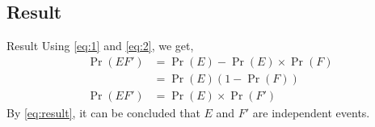 \documentclass{beamer}
\providecommand{\pr}[1]{\ensuremath{\Pr\left(#1\right)}}
\providecommand{\brak}[1]{\ensuremath{\left(#1\right)}}
\begin{document}
\subsection{Result}
\begin{frame}{Result}
    Using \eqref{eq:1} and \eqref{eq:2}, we get,
    \begin{align}
        \pr{EF'} & = \pr{E} - \pr{E} \times \pr{F}
        \\
                 & = \pr{E}\brak{1 - \pr{F}}
        \\
        \label{eq:result}
        \pr{EF'} & = \pr{E} \times \pr{F'}
    \end{align}
    By \eqref{eq:result}, it can be concluded that $E$ and $F'$ are independent events.
\end{frame}

\end{document}
